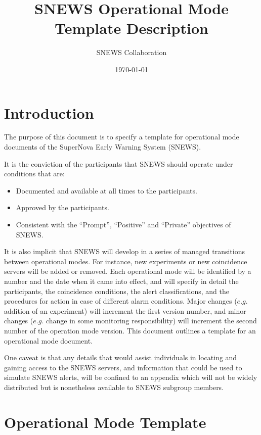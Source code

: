 \documentclass{article}
\begin{document}
\title{SNEWS Operational Mode Template Description}         
\author{SNEWS Collaboration}
\date{\today}
\maketitle

\section{Introduction}      
The purpose of this document is to specify a template for operational
mode documents of the SuperNova Early Warning System (SNEWS).

It is the conviction of the participants that SNEWS should operate
under conditions that are:

\begin{itemize}
\item Documented and available at all times to the participants.
\item Approved by the participants.
\item Consistent with the ``Prompt'', ``Positive'' and ``Private''
objectives of SNEWS.
\end{itemize}

It is also implicit that SNEWS will develop in a series of managed
transitions between operational modes. For instance, new experiments
or new coincidence servers will be added or removed.  Each operational
mode will be identified by a number and the date when it came into
effect, and will specify in detail the participants, the coincidence
conditions, the alert classifications, and the procedures for action
in case of different alarm conditions.  Major changes ($e.g.$ addition
of an experiment) will increment the first version number, and minor changes
($e.g.$ change in some monitoring responsibility) will increment the
second number of the operation mode version.  This document outlines a
template for an operational mode document.

One caveat is that any details that would assist individuals in locating
and gaining access to the SNEWS servers, and information that could be
used to simulate SNEWS alerts, will be confined to an appendix which
will not be widely distributed but is nonetheless available to SNEWS
subgroup members.


\section{Operational Mode Template}
\end{document}
